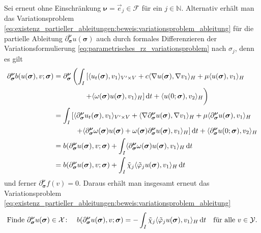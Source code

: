 \documentclass[../main.tex]{subfiles}
\begin{document}
\begin{Bemerkung}
\label{bemerkung:alternative_herleitung_variationsproblem_ableitung}
    Sei erneut ohne Einschränkung $\bm\nu = \vec e_{j} \in \mathcal{F}$ für ein $j \in \mathbb{N}$.
    Alternativ erhält man das Variationsproblem \cref{eq:existenz_partieller_ableitungen:beweis:variationsproblem_ableitung} für die partielle Ableitung $\partial^{\bm\nu}_{\bm\sigma} u(\bm\sigma)$ auch durch formales Differenzieren der Variationsformulierung \cref{eq:parametrisches_rz_variationsproblem} nach $\sigma_{j}$, denn es gilt
    \begin{align}
        \partial^{\bm\nu}_{\bm\sigma} b(u(\bm\sigma), v; \bm\sigma)
        &= \partial^{\bm\nu}_{\bm\sigma} \left( \int_{I} \left[ \skp{u_{t}(\bm\sigma)}{v_{1}}{V' \times V} + c \skp{\grad u(\bm\sigma)}{\grad v_{1}}{H} + \mu \skp{u(\bm\sigma)}{v_{1}}{H} \right.\right.
        \\&\qquad\qquad \left.\vphantom{\int_{I}}\left. + \skp{\omega(\bm\sigma) u(\bm\sigma)}{v_{1}}{H} \right] \diff t + \skp{u(0; \bm\sigma)}{v_{2}}{H} \right)
        \\&= \int_{I} \left[ \skp{\partial^{\bm\nu}_{\bm\sigma} u_{t}(\bm\sigma)}{v_{1}}{V' \times V}
            + \skp{\grad \partial^{\bm\nu}_{\bm\sigma} u(\bm\sigma)}{\grad v_{1}}{H} + \mu \skp{\partial^{\bm\nu}_{\bm\sigma} u(\bm\sigma)}{v_{1}}{H} \right.
        \\&\qquad \quad \left.+ \skp{\partial^{\bm\nu}_{\bm\sigma} \omega(\bm\sigma) u(\bm\sigma) + \omega(\bm\sigma) \partial^{\bm\nu}_{\bm\sigma} u(\bm\sigma)}{v_{1}}{H} \right] \diff t + \skp{\partial^{\bm\nu}_{\bm\sigma} u(0; \bm\sigma)}{v_{2}}{H}
        \\&= b(\partial^{\bm\nu}_{\bm\sigma} u(\bm\sigma), v; \bm\sigma) + \int_{I} \skp{\partial^{\bm\nu}_{\bm\sigma} \omega(\bm\sigma) u(\bm\sigma)}{v_{1}}{H} \diff t
        \\&= b(\partial^{\bm\nu}_{\bm\sigma} u(\bm\sigma), v; \bm\sigma) + \int_{I} \tilde{\chi}_{j} \skp{\tilde{\varphi}_{j} u(\bm\sigma)}{v_{1}}{H} \diff t
    \end{align}
    und ferner $\partial^{\bm\nu}_{\bm\sigma} f(v) = 0$.
    Daraus erhält man insgesamt erneut das Variationsproblem \cref{eq:existenz_partieller_ableitungen:beweis:variationsproblem_ableitung}
    \begin{equation}
        \text{Finde}~\partial^{\bm\nu}_{\bm\sigma} u(\bm\sigma) \in \mathcal X \colon \quad b(\partial^{\bm\nu}_{\bm\sigma} u(\bm\sigma), v; \bm\sigma) = - \int_{I} \tilde{\chi}_{j} \skp{\tilde{\varphi}_{j}  u(\bm\sigma)}{v_{1}}{H} \diff t \quad \fa v \in \mathcal Y.
    \end{equation}
\end{Bemerkung}
\end{document}
